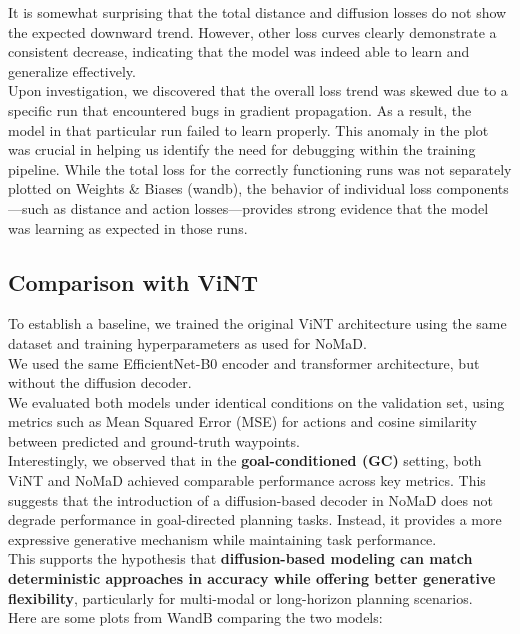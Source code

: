 \documentclass[12pt]{article}
\begin{document}
It is somewhat surprising that the total distance and diffusion losses do not show the expected downward trend. However, other loss curves clearly demonstrate a consistent decrease, indicating that the model was indeed able to learn and generalize effectively.\\
Upon investigation, we discovered that the overall loss trend was skewed due to a specific run that encountered bugs in gradient propagation. As a result, the model in that particular run failed to learn properly. This anomaly in the plot was crucial in helping us identify the need for debugging within the training pipeline.
While the total loss for the correctly functioning runs was not separately plotted on Weights & Biases (wandb), the behavior of individual loss components—such as distance and action losses—provides strong evidence that the model was learning as expected in those runs.
\subsection*{Comparison with ViNT}
To establish a baseline, we trained the original ViNT architecture using the same dataset and training hyperparameters as used for NoMaD.\\
We used the same EfficientNet-B0 encoder and transformer architecture, but without the diffusion decoder.\\
We evaluated both models under identical conditions on the validation set, using metrics such as Mean Squared Error (MSE) for actions and cosine similarity between predicted and ground-truth waypoints.\\
Interestingly, we observed that in the \textbf{goal-conditioned (GC)} setting, both ViNT and NoMaD achieved comparable performance across key metrics. This suggests that the introduction of a diffusion-based decoder in NoMaD does not degrade performance in goal-directed planning tasks. Instead, it provides a more expressive generative mechanism while maintaining task performance.\\
This supports the hypothesis that \textbf{diffusion-based modeling can match deterministic approaches in accuracy while offering better generative flexibility}, particularly for multi-modal or long-horizon planning scenarios.\\
Here are some plots from WandB comparing the two models:\\
\end{document}
